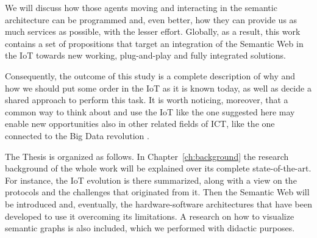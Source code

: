\documentclass[11pt, twoside, openright]{report}   	%
\begin{document}
We will discuss how those agents moving and interacting in the semantic architecture can be programmed and, even better, how they can provide us as much services as possible, with the lesser effort. Globally, as a result, this work contains a set of propositions that target an integration of the Semantic Web in the IoT towards new working, plug-and-play and fully integrated solutions. 

Consequently, the outcome of this study is a complete description of why and how we should put some order in the IoT as it is known today, as well as decide a shared approach to perform this task. It is worth noticing, moreover, that a common way to think about and use the IoT like the one suggested here may enable new opportunities  also in other related fields of ICT, like the one connected to the Big Data revolution \cite{mcafee2012big}.


The Thesis is organized as follows. In Chapter~\ref{ch:background} the research background of the whole work will be explained over its complete state-of-the-art. For instance, the IoT evolution is there summarized, along with a view on the protocols and the challenges that originated from it. Then the Semantic Web will be introduced and, eventually, the hardware-software architectures that have been developed to use it overcoming its limitations. A research on how to visualize semantic graphs is also included, which we performed with didactic purposes.
\end{document}
